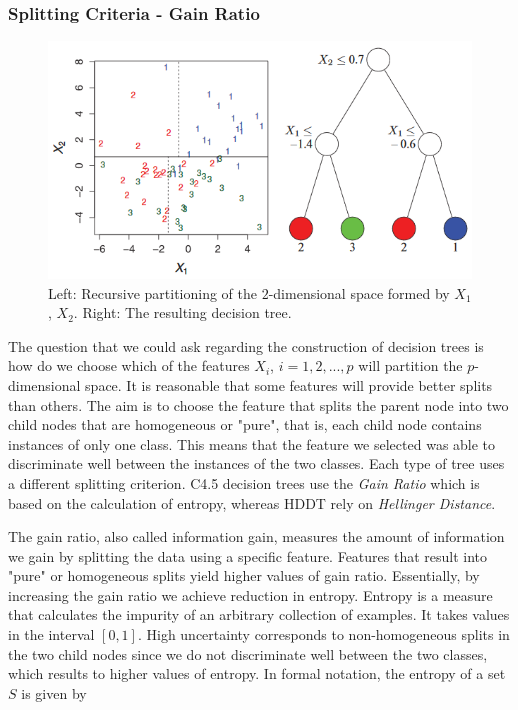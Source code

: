 \documentclass{acm_proc_article-sp}
\begin{document}
\subsubsection{Splitting Criteria - Gain Ratio}

\begin{figure}
	\centering
	\includegraphics[scale=.52]{Partitioning}
	\caption{Left: Recursive partitioning of the $2$-dimensional space formed by $X_1$, $X_2$. Right: The resulting decision tree.}
	\label{Fig1}
\end{figure}	

The question that we could ask regarding the construction of decision trees is how do we choose which of the features $X_i$, $i = 1,2,...,p$ will partition the $p$-dimensional space. It is reasonable that some features will provide better splits than others. The aim is to choose the feature that splits the parent node into two child nodes that are homogeneous or "pure", that is, each child node contains instances of only one class. This means that the feature we selected was able to discriminate well between the instances of the two classes. Each type of tree uses a different splitting criterion. C4.5 decision trees use the \textit{Gain Ratio} which is based on the calculation of entropy, whereas HDDT rely on \textit{Hellinger Distance}.

The gain ratio, also called information gain, measures the amount of information we gain by splitting the data using a specific feature. Features that result into "pure" or homogeneous splits yield higher values of gain ratio. Essentially, by increasing the gain ratio we achieve reduction in entropy. Entropy is a measure that calculates the impurity of an arbitrary collection of examples. It takes values in the interval $[0,1]$. High uncertainty corresponds to non-homogeneous splits in the two child nodes since we do not discriminate well between the two classes, which results to higher values of entropy. In formal notation, the entropy of a set $S$ is given by
\end{document}
